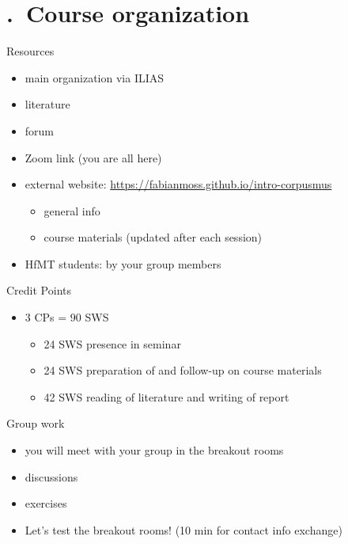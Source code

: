 \section{\thesection.~Course organization}

\begin{frame}{Resources}
    \begin{itemize}
      \item main organization via ILIAS
      \item literature
      \item forum
      \item Zoom link (you are all here)
      \item external website: \url{https://fabianmoss.github.io/intro-corpusmus}
      \begin{itemize}
        \item general info
        \item course materials (updated after each session)
      \end{itemize}
      \item HfMT students: by your group members
  \end{itemize}
\end{frame}

\begin{frame}{Credit Points}
  \begin{itemize}
    \item 3 CPs = 90 SWS
    \begin{itemize}
      \item 24 SWS presence in seminar
      \item 24 SWS preparation of and follow-up on course materials
      \item 42 SWS reading of literature and writing of report
    \end{itemize}
  \end{itemize}
\end{frame}

\begin{frame}{Group work}
  \begin{itemize}
    \item you will meet with your group in the breakout rooms
    \item discussions
    \item exercises
    \item Let's test the breakout rooms! (10 min for contact info exchange)
  \end{itemize}
\end{frame}

